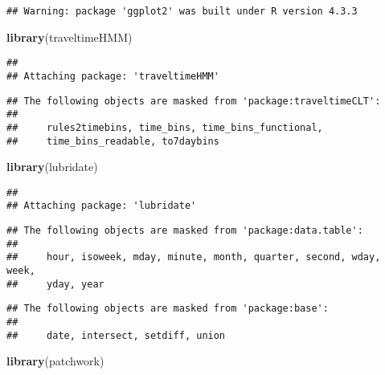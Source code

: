 \documentclass[
]{article}
\newenvironment{Shaded}{\begin{snugshade}}{\end{snugshade}}
\newcommand{\FunctionTok}[1]{\textcolor[rgb]{0.13,0.29,0.53}{\textbf{#1}}}
\newcommand{\NormalTok}[1]{#1}
\begin{document}
\begin{verbatim}
## Warning: package 'ggplot2' was built under R version 4.3.3
\end{verbatim}

\begin{Shaded}
\begin{Highlighting}[]
\FunctionTok{library}\NormalTok{(traveltimeHMM)}
\end{Highlighting}
\end{Shaded}

\begin{verbatim}
## 
## Attaching package: 'traveltimeHMM'
\end{verbatim}

\begin{verbatim}
## The following objects are masked from 'package:traveltimeCLT':
## 
##     rules2timebins, time_bins, time_bins_functional,
##     time_bins_readable, to7daybins
\end{verbatim}

\begin{Shaded}
\begin{Highlighting}[]
\FunctionTok{library}\NormalTok{(lubridate)}
\end{Highlighting}
\end{Shaded}

\begin{verbatim}
## 
## Attaching package: 'lubridate'
\end{verbatim}

\begin{verbatim}
## The following objects are masked from 'package:data.table':
## 
##     hour, isoweek, mday, minute, month, quarter, second, wday, week,
##     yday, year
\end{verbatim}

\begin{verbatim}
## The following objects are masked from 'package:base':
## 
##     date, intersect, setdiff, union
\end{verbatim}

\begin{Shaded}
\begin{Highlighting}[]
\FunctionTok{library}\NormalTok{(patchwork)}
\end{Highlighting}
\end{Shaded}
\end{document}
